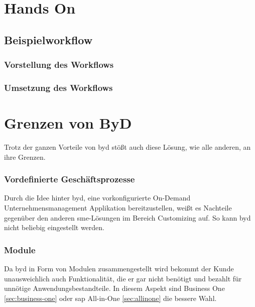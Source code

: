 \section{Hands On}

\subsection{Beispielworkflow}
\label{sec:byd-bsp}

\subsubsection{Vorstellung des Workflows}
\label{sec:byd-bsp-vorstellung}

\subsubsection{Umsetzung des Workflows}
\label{sec:byd-bsp-umsetzung}

\section{Grenzen von ByD}

Trotz der ganzen Vorteile von \gls{byd} stößt auch diese Lösung, wie alle anderen, an ihre Grenzen.

\subsubsection{Vordefinierte Geschäftsprozesse}

Durch die Idee hinter \gls{byd}, eine vorkonfigurierte On-Demand Unternehmensmanagement Applikation bereitzustellen, weißt es Nachteile gegenüber den anderen \gls{sme}-Lösungen im Bereich Customizing auf. So kann \gls{byd} nicht beliebig eingestellt werden.

\subsubsection{Module}

Da \gls{byd} in Form von Modulen zusammengestellt wird bekommt der Kunde unausweichlich auch Funktionalität, die er gar nicht benötigt und bezahlt für unnötige Anwendungsbestandteile. In diesem Aspekt sind Business One \ref{sec:business-one} oder \gls{sap} All-in-One \ref{sec:allinone} die bessere Wahl.

